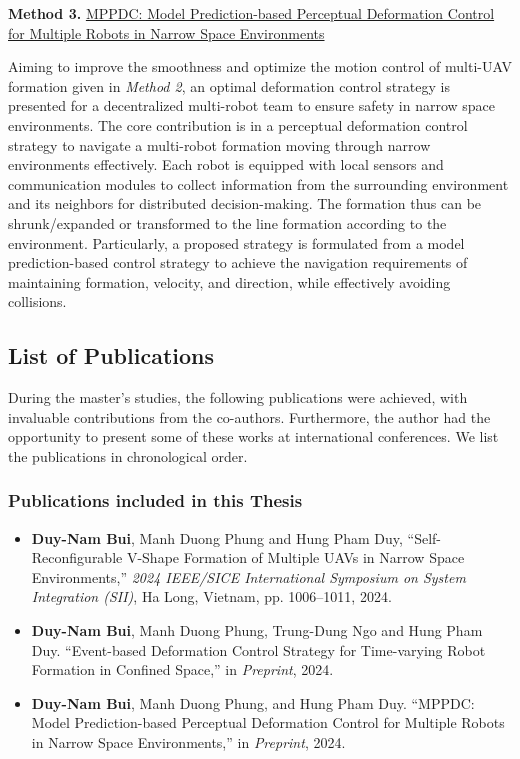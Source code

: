 \noindent \textbf{Method 3.} \hyperref[paper3]{MPPDC: Model Prediction-based Perceptual Deformation Control for Multiple Robots in Narrow Space Environments}

Aiming to improve the smoothness and optimize the motion control of multi-UAV formation given in \textit{Method 2}, an optimal deformation control strategy is presented for a decentralized multi-robot team to ensure safety in narrow space environments. The core contribution is in a perceptual deformation control strategy to navigate a multi-robot formation moving through narrow environments effectively. Each robot is equipped with local sensors and communication modules to collect information from the surrounding environment and its neighbors for distributed decision-making. The formation thus can be shrunk/expanded or transformed to the line formation according to the environment. Particularly, a proposed strategy is formulated from a model prediction-based control strategy to achieve the navigation requirements of maintaining formation, velocity, and direction, while effectively avoiding collisions.

\subsection{List of Publications}\label{sec22}
During the master's studies, the following publications were achieved, with invaluable contributions from the co-authors. Furthermore, the author had the opportunity to present some of these works at international conferences. We list the publications in chronological order.
\subsubsection{Publications included in this Thesis}
\begin{itemize}
    \item \textbf{Duy-Nam Bui}, Manh Duong Phung and Hung Pham Duy, ``Self-Reconfigurable V-Shape Formation of Multiple UAVs in Narrow Space Environments,'' \textit{2024 IEEE/SICE International Symposium on System Integration (SII)}, Ha Long, Vietnam, pp. 1006--1011, 2024.
        \item \textbf{Duy-Nam Bui}, Manh Duong Phung, Trung-Dung Ngo and Hung Pham Duy. ``Event-based Deformation Control Strategy for Time-varying Robot Formation in Confined Space,'' in \textit{Preprint}, 2024.
    \item \textbf{Duy-Nam Bui}, Manh Duong Phung, and Hung Pham Duy. ``MPPDC: Model Prediction-based Perceptual Deformation Control for Multiple Robots in Narrow Space Environments,'' in \textit{Preprint}, 2024.
\end{itemize}

